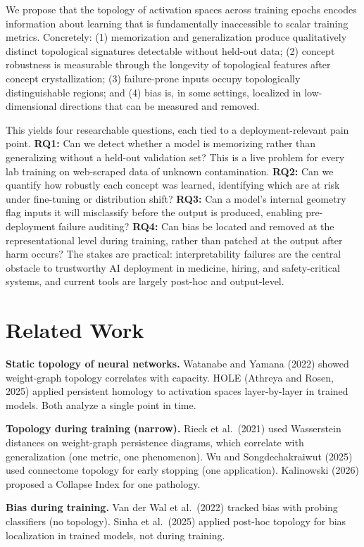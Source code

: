 \documentclass[10pt]{article}
\begin{document}
We propose that the topology of activation spaces across training epochs encodes information about learning that is fundamentally inaccessible to scalar training metrics. Concretely: (1) memorization and generalization produce qualitatively distinct topological signatures detectable without held-out data; (2) concept robustness is measurable through the longevity of topological features after concept crystallization; (3) failure-prone inputs occupy topologically distinguishable regions; and (4) bias is, in some settings, localized in low-dimensional directions that can be measured and removed.

This yields four researchable questions, each tied to a deployment-relevant pain point. \textbf{RQ1:} Can we detect whether a model is memorizing rather than generalizing without a held-out validation set? This is a live problem for every lab training on web-scraped data of unknown contamination. \textbf{RQ2:} Can we quantify how robustly each concept was learned, identifying which are at risk under fine-tuning or distribution shift? \textbf{RQ3:} Can a model's internal geometry flag inputs it will misclassify before the output is produced, enabling pre-deployment failure auditing? \textbf{RQ4:} Can bias be located and removed at the representational level during training, rather than patched at the output after harm occurs? The stakes are practical: interpretability failures are the central obstacle to trustworthy AI deployment in medicine, hiring, and safety-critical systems, and current tools are largely post-hoc and output-level.

\section{Related Work}

\textbf{Static topology of neural networks.} Watanabe and Yamana (2022) showed weight-graph topology correlates with capacity. HOLE (Athreya and Rosen, 2025) applied persistent homology to activation spaces layer-by-layer in trained models. Both analyze a single point in time.

\textbf{Topology during training (narrow).} Rieck et al.\ (2021) used Wasserstein distances on weight-graph persistence diagrams, which correlate with generalization (one metric, one phenomenon). Wu and Songdechakraiwut (2025) used connectome topology for early stopping (one application). Kalinowski (2026) proposed a Collapse Index for one pathology.

\textbf{Bias during training.} Van der Wal et al.\ (2022) tracked bias with probing classifiers (no topology). Sinha et al.\ (2025) applied post-hoc topology for bias localization in trained models, not during training.
\end{document}
